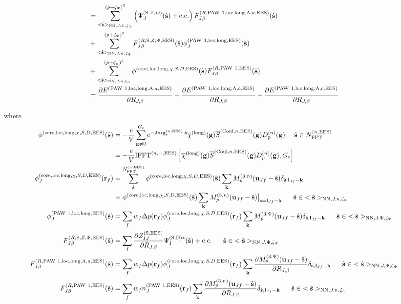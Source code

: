 \documentclass[paper=a4, fontsize=11pt]{article} %
\numberwithin{equation}{section} %
\numberwithin{figure}{section} %
\numberwithin{table}{section} %
\newcommand{\p}{\partial}
\newcommand{\ol}{\overline}
\newcommand{\bu}{{\bf{u}}}
\newcommand{\bl}{{\bf{l}}}
\newcommand{\bk}{{\bf{k}}}
\newcommand{\bs}{{\bf{s}}}
\newcommand{\bg}{{\bf{g}}}
\newcommand{\br}{{\bf{r}}}
\newcommand{\hs}{{\hat{\bf{s}}}}
\newcommand{\rS}{{\mathrm{S}}}
\newcommand{\rEES}{{\mathrm{EES}}}
\newcommand{\rcore}{{\mathrm{core}}}
\newcommand{\rNN}{{\mathrm{NN}}}
\newcommand{\re}{{\mathrm{e}}}
\newcommand{\rCo}{{\mathrm{Coul}}}
\newcommand{\rcc}{{\mathrm{c.c.}}}
\newcommand{\rlong}{{\mathrm{long}}}
\newcommand{\rP}{{\mathrm{PAW}}}
\newcommand{\rA}{{\mathrm{A}}}
\newcommand{\rD}{{\mathrm{D}}}
\newcommand{\rlo}{{\mathrm{loc}}}
\newcommand{\gcnEES}{{\bg_c^{(n,\rEES)}}}
\newcommand{\igcnEESs}{2\pi i\gcnEES\cdot\hat \bs}
\newcommand{\RJb}{{R_{J,\beta}}}
\newcommand{\NFFTnEES}{{N^{(n,\rEES)}_{\mathrm{FFT}}}}
\newcommand{\Gc}{{G_{\mathrm{c}}}}
\newcommand{\Mn}{{M_p^{(3,n)}}}
\newcommand{\Mp}{{M_p^{(3,\Psi)}}}
\newcommand{\IFFTniEES}{{\mathrm{IFFT}^{(n,-,\rEES)}}}
\newcommand{\pzp}{{(p+\zeta_{\Psi})^3}}
\newcommand{\pzn}{{(p+\zeta_n)^3}}
\newcommand{\hsJp}{{<\hs>_{\rNN,J,\Psi,\zeta_\Psi}}}
\newcommand{\hsJn}{{<\hs>_{\rNN,J,n,\zeta_n}}}
\newcommand{\hsinJp}{{\ \ \ \ \ \hs  \in  \hsJp}}
\newcommand{\hsinJn}{{\ \ \ \ \ \hs  \in  \hsJn}}
\newcommand{\hsinnEES}{{\ \ \ \ \hs \in \NFFTnEES}}
\begin{document}
\begin{equation}
\begin{split}
&=\sum_{\hsJp}^{\pzp} \left(\Psi_J^{(\rS,Z,D)}(\hat \bs)+ \rcc\right) F_{J\beta}^{(R,\rP\ 1,\rlo,\rlong,\rA,a,\rEES)}(\hs) \\
&+ \sum_{\hsJp}^{\pzp} F_{J\beta}^{(R,\rS,Z,\Psi,\rEES)}(\hs) \phi_J^{(\rP\ 1,\rlo,\rlong,\rEES)}(\hs)\\
&+ \sum_{\hsJn}^{\pzn} \phi^{(\rcore,\rlo,\rlong,\chi,S,D,\rEES)}(\hs)  F_{J\beta}^{(R,\rP\ 1,\rEES)}(\hs) \\
&= \frac{\p E^{(\rP\ 1,\rlo,\rlong,\rA,a,\rEES)}}{\p \RJb}
+ \frac{\p E^{(\rP\ 1,\rlo,\rlong,\rA,b,\rEES)}}{\p \RJb} + \frac{\p E^{(\rP\ 1,\rlo,\rlong,\rA,c,\rEES)}}{\p \RJb}
\end{split}
\end{equation}



where
\begin{equation}
\begin{split}
\phi^{(\rcore,\rlo,\rlong,\chi,S,D,\rEES)}(\hs) &= -\frac{e}{V} \sum_{\bg \neq 0}^{\Gc} \re^{-\igcnEESs} \ol \chi^{(\rlong)}(\bg) \ol S^{(\rCo,n,\rEES)}(\bg) D_p^{(n)}(\bg) \hsinnEES\\
&= -\frac{e}{V} \IFFTniEES\left[\ol \chi^{(\rlong)}(\bg) \ol S^{(\rCo,n,\rEES)}(\bg) D_p^{(n)}(\bg),\Gc\right]\\
\phi_J^{(\rcore,\rlo,\rlong,\chi,S,D,\rEES)}(\br_f) &= \sum_{\hat \bs}^{\NFFTnEES} \phi^{(\rcore,\rlo,\rlong,\chi,S,D,\rEES)}(\hs)  \sum_{\bk}  \Mn(\bu_{Jf}-\hat \bs)\delta_{\hat \bs,\bl_{Jf}-\bk} \\
&= \phi^{(\rcore,\rlo,\rlong,\chi,S,D,\rEES)}(\hs) \sum_{\bk}  \Mn(\bu_{Jf}-\hat \bs)\big|_{\hs=\bl_{Jf}-\bk}   \hsinJn\\
\phi_J^{(\rP\ 1,\rlo,\rlong,\rEES)}(\hs) &= \sum_f w_f \Delta p(\br_f) \phi_J^{(\rcore,\rlo,\rlong,\chi,S,D,\rEES)}(\br_f)  \sum_{\bk} \Mp(\bu_{Jf}-\hat \bs) \delta_{\hat \bs,\bl_{Jf}-\bk}\hsinJp\\
F_{J\beta}^{(R,\rS,Z,\Psi,\rEES)}(\hs) &= \sum_I \frac{\p Z_{IJ}^{(\rS,\rEES)}}{\p \RJb}\Psi_I^{(\rS,\rD)*}(\hat \bs) + \rcc \hsinJp\\
F_{J\beta}^{(R,\rP\ 1,\rlo,\rlong,\rA,a,\rEES)}(\hs) &= \sum_f w_f \Delta p(\br_f) \phi_J^{(\rcore,\rlo,\rlong,\chi,S,D,\rEES)}(\br_f) \sum_{\bk} \frac{\p \Mp(\bu_{Jf}-\hat \bs)}{\p \RJb} \delta_{\hat \bs,\bl_{Jf}-\bk}\hsinJp \\
F_{J\beta}^{(R,\rP\ 1,\rEES)}(\hs) &= \sum_f w_f  n_J^{(\rP\ 1,\rEES)}(\br_f) \sum_{\bk}  \frac{\p \Mn(\bu_{Jf}-\hat \bs)}{\p \RJb}\delta_{\hat \bs,\bl_{Jf}-\bk} \hsinJn\\
\end{split}
\end{equation}
\end{document}
